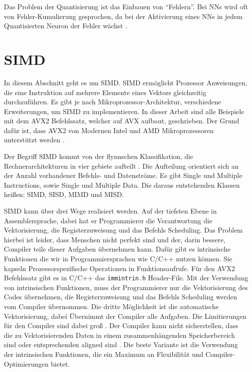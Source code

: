 Das Problem der Quantisierung ist das Einbauen von \enquote{Fehlern}. Bei \acp{NN} wird oft von Fehler-Kumulierung gesprochen, da bei der Aktivierung eines \acp{NN} in jedem Quantisierten Neuron der Fehler wächst \cite{Park2018}.

\section{SIMD}

In diesem Abschnitt geht es um \ac{SIMD}. \ac{SIMD} ermöglicht Prozessor Anweisungen, die eine Instruktion auf mehrere Elemente eines Vektors gleichzeitig durchzuführen. Es gibt je nach Mikroprozessor-Architektur, verschiedene Erweiterungen, um \ac{SIMD} zu implementieren. In dieser Arbeit sind alle Beispiele mit dem \ac{AVX2} Befehlssatz, welcher auf \ac{AVX} aufbaut, geschrieben. Der Grund dafür ist, dass \ac{AVX2} von Modernen Intel und AMD Mikroprozessoren unterstützt werden \cite[S. 117]{fog2006optimizing}.

Der Begriff \ac{SIMD} kommt von der flynnschen Klassifikation, die Rechnerarchitekturen in vier gebiete aufteilt \cite{Flynn1972}. Die Aufteilung orientiert sich an der Anzahl vorhandener Befehls- und Datenströme. Es gibt Single und Multiple Instructions, sowie Single und Multiple Data. Die daraus entstehenden Klassen heißen: \ac{SIMD}, \ac{SISD}, \ac{MIMD} und \ac{MISD}.

\ac{SIMD} kann über drei Wege realisiert werden. Auf der tiefsten Ebene in Assemblersprache, dabei hat er Programmierer die Verantwortung die Vektorisierung, die Registerzuweisung und das Befehls Scheduling. Das Problem hierbei ist leider, dass Menschen nicht perfekt sind und der, darin bessere, Compiler teile dieser Aufgaben übernehmen kann. Dafür gibt es intrinsische Funktionen die wir in Programmiersprachen wie C/C++ nutzen können. Sie kapseln Prozessorspezifische Operationen in Funktionsaufrufe. Für den \ac{AVX2} Befehlssatz gibt es in C/C++ das \lstinline[language=C++]{immintrin.h} Header-File. Mit der Verwendung von intrinsischen Funktionen, muss der Programmierer nur die Vektorisierung des Codes übernehmen, die Registerzuweisung und das Befehls Scheduling werden vom Compiler übernommen. Die dritte Möglichkeit ist die automatische Vektorisierung, dabei Übernimmt der Compiler alle Aufgaben. Die Limitierungen für den Compiler sind dabei groß \cite{ren2003preliminary}. Der Compiler kann nicht sicherstellen, dass die zu Vektorisierenden Daten in einem zusammenhängenden Speicherbereich sind oder entsprechenden aligned sind \cite[S. 118-120]{fog2006optimizing}. Die beste Variante ist die Verwendung der intrinsischen Funktionen, die ein Maximum an Flexibilität und Compiler-Optimierungen bietet.

